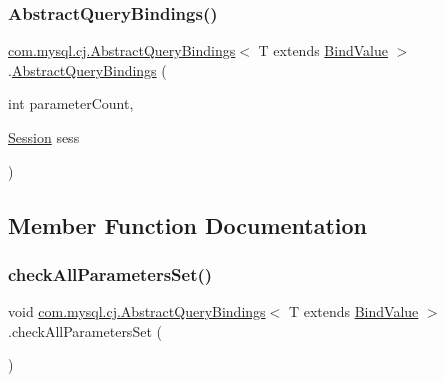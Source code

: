 \subsubsection{\texorpdfstring{Abstract\+Query\+Bindings()}{AbstractQueryBindings()}}
{\footnotesize\ttfamily \mbox{\hyperlink{classcom_1_1mysql_1_1cj_1_1_abstract_query_bindings}{com.\+mysql.\+cj.\+Abstract\+Query\+Bindings}}$<$ T extends \mbox{\hyperlink{interfacecom_1_1mysql_1_1cj_1_1_bind_value}{Bind\+Value}} $>$.\mbox{\hyperlink{classcom_1_1mysql_1_1cj_1_1_abstract_query_bindings}{Abstract\+Query\+Bindings}} (\begin{DoxyParamCaption}\item[{int}]{parameter\+Count,  }\item[{\mbox{\hyperlink{interfacecom_1_1mysql_1_1cj_1_1_session}{Session}}}]{sess }\end{DoxyParamCaption})}



\subsection{Member Function Documentation}
\mbox{\label{classcom_1_1mysql_1_1cj_1_1_abstract_query_bindings_a7e9658d2e8bcf61a2e0a7b020d31e2ee}} 
\subsubsection{\texorpdfstring{check\+All\+Parameters\+Set()}{checkAllParametersSet()}}
{\footnotesize\ttfamily void \mbox{\hyperlink{classcom_1_1mysql_1_1cj_1_1_abstract_query_bindings}{com.\+mysql.\+cj.\+Abstract\+Query\+Bindings}}$<$ T extends \mbox{\hyperlink{interfacecom_1_1mysql_1_1cj_1_1_bind_value}{Bind\+Value}} $>$.check\+All\+Parameters\+Set (\begin{DoxyParamCaption}{ }\end{DoxyParamCaption})}

\mbox{\label{classcom_1_1mysql_1_1cj_1_1_abstract_query_bindings_a0df45abda5a160a740ff9206f3f05f7a}} 
